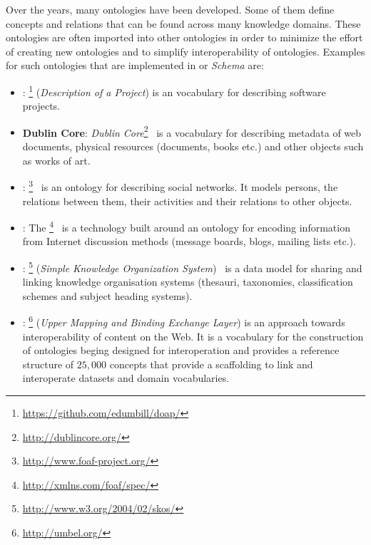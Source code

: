 Over the years, many ontologies have been developed. Some of them define concepts and relations that can be found across many knowledge domains. These ontologies are often imported into other ontologies in order to minimize the effort of creating new ontologies and to simplify interoperability of ontologies. Examples for such ontologies that are implemented in  or \emph{ Schema} are:
\begin{itemize}
  \item \textbf{}: \footnote{\href{https://github.com/edumbill/doap/}{https://github.com/edumbill/doap/}} (\emph{Description of a Project}) is an vocabulary for describing software projects.
  \item \textbf{Dublin Core}: \emph{Dublin Core}\footnote{\href{http://dublincore.org/}{http://dublincore.org/}}~\cite{rfc5013} is a vocabulary for describing metadata of web documents, physical resources (documents, books etc.) and other objects such as works of art.
  \item \textbf{}: \footnote{\href{http://www.foaf-project.org/}{http://www.foaf-project.org/}}~\cite{FOAF} is an ontology for describing social networks. It models persons, the relations between them, their activities and their relations to other objects.
  \item \textbf{}: The  \footnote{\href{http://xmlns.com/foaf/spec/}{http://xmlns.com/foaf/spec/}}~\cite{SIOC} is a technology built around an ontology for encoding information from Internet discussion methods (message boards, blogs, mailing lists etc.).
  \item \textbf{}: \footnote{\href{http://www.w3.org/2004/02/skos/}{http://www.w3.org/2004/02/skos/}} (\emph{Simple Knowledge Organization System})~\cite{SKOS} is a data model for sharing and linking knowledge organisation systems (thesauri, taxonomies, classification schemes and subject heading systems).
  \item \textbf{}: \footnote{\href{http://umbel.org/}{http://umbel.org/}} (\emph{Upper Mapping and Binding Exchange Layer}) is an approach towards interoperability of content on the Web. It is a vocabulary for the construction of ontologies beging designed for interoperation and provides a reference structure of $25,000$ concepts that provide a scaffolding to link and interoperate datasets and domain vocabularies.
\end{itemize}

